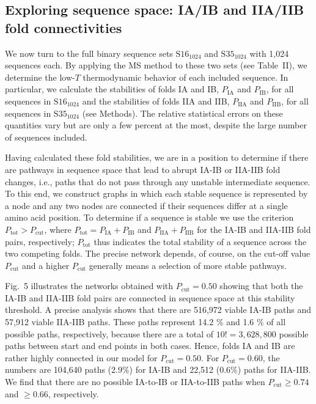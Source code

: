 \documentclass[
aip,
rsi,%
amsmath,amssymb,
reprint,%
]{revtex4-1}
\newcommand {\Pcut}     	{{P_\mathrm{cut}}}
\newcommand {\Ptot}	{{P_\mathrm{tot}}}
\newcommand {\PIA}    	{{P_\mathrm{IA}}}
\newcommand {\PIB}    	{{P_\mathrm{IB}}}
\newcommand {\PIIA}    	{{P_\mathrm{IIA}}}
\newcommand {\PIIB}    	{{P_\mathrm{IIB}}}
\newcommand {\SI}		{${\mathrm{S16}_{1024}}$}
\newcommand {\SII}		{${\mathrm{S35}_{1024}}$}
\begin{document}
\subsection{Exploring sequence space: IA/IB and IIA/IIB fold connectivities}
\noindent
We now turn to the full binary sequence sets {\SI} and {\SII} with 1,024 sequences each. By applying the MS method to these two sets (see Table~II), we determine the low-$T$ thermodynamic behavior of each included sequence. In particular, we calculate the stabilities of folds IA and IB, $\PIA$ and $\PIB$, for all sequences in {\SI} and the stabilities of folds IIA and IIB, $\PIIA$ and $\PIIB$, for all sequences in {\SII} (see Methods). The relative statistical errors on these quantities vary but are only a few percent at the most, despite the large number of sequences included.  

Having calculated these fold stabilities, we are in a position to determine if there are pathways in sequence space that lead to abrupt IA-IB or IIA-IIB fold changes, i.e., paths that do not pass through any unstable intermediate sequence. To this end, we construct graphs in which each stable sequence is represented by a node and any two nodes are connected if their sequences differ at a single amino acid position. To determine if a sequence is stable we use the criterion $P_\mathrm{tot}>\Pcut$, where  $\Ptot = \PIA + \PIB$ and $\PIIA + \PIIB$ for the IA-IB and IIA-IIB fold pairs, respectively; $\Ptot$ thus indicates the total stability of a sequence across the two competing folds. The precise network depends, of course, on the cut-off value $\Pcut$ and a higher $\Pcut$ generally means a selection of more stable pathways. 

Fig.~5 illustrates the networks obtained with $\Pcut=0.50$ showing that both the IA-IB and IIA-IIB fold pairs are connected in sequence space at this stability threshold. A precise analysis shows that there are 516,972 viable IA-IB paths and 57,912 viable IIA-IIB paths. These paths represent 14.2 \% and 1.6 \% of all possible paths, respectively, because there are a total of $10! =3,628,800$ possible paths between start and end points in both cases. Hence, folds IA and IB are rather highly connected in our model for $\Pcut= 0.50$. For $\Pcut=0.60$, the numbers are 104,640 paths (2.9\%) for IA-IB and 22,512 (0.6\%) paths for IIA-IIB. We find that there are no possible IA-to-IB or IIA-to-IIB paths when $\Pcut\ge0.74$ and $\ge 0.66$, respectively. \\
\end{document}
